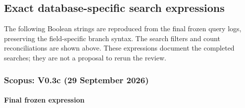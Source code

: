 \subsection{Exact database-specific search expressions}

The following Boolean strings are reproduced from the final frozen query logs, preserving the field-specific branch syntax. The search filters and count reconciliations are shown above. These expressions document the completed searches; they are not a proposal to rerun the review.

\subsubsection{Scopus: V0.3c (29 September 2026)}

\paragraph{Final frozen expression}

